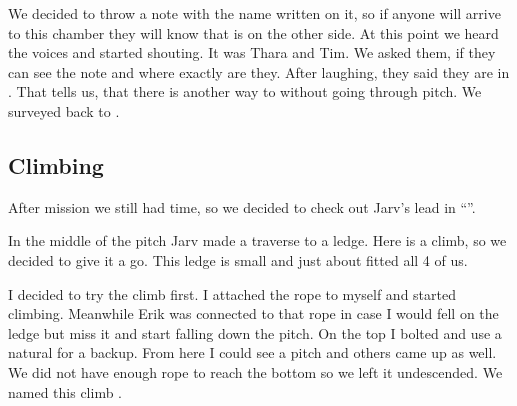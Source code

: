 We decided to throw a note with the
name  written on it, so if anyone will arrive to this chamber they will know that  is on the other side. At this point we heard the voices and started shouting. It was Thara and Tim. We asked
them, if they can see the note and where exactly are they. After
laughing, they said they are in . That tells us, that
there is another way to  without going through
 pitch. We surveyed back to .



\subsection{Climbing \protect{}}

After  mission we still had time, so we decided to check
out Jarv's lead in ``''.

In the middle of the  pitch Jarv made a traverse to a
ledge. Here is a climb, so we decided to give it a go. This ledge is
small and just about fitted all 4 of us.

I decided to try the climb first. I attached the rope to myself and
started climbing. Meanwhile Erik was connected to that rope in case I
would fell on the ledge but miss it and start falling down the pitch. On
the top I bolted and use a natural for a backup. From here I could see a
pitch and others came up as well. We did not have enough rope to reach
the bottom so we left it undescended. We named this climb .



